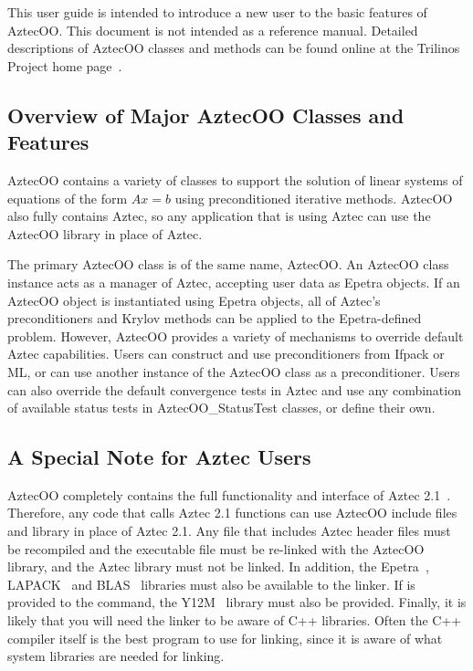 \documentclass[12pt,relax]{AztecOOUserGuide}
\newcommand{\statustest}{AztecOO\_StatusTest}
\begin{document}
This user guide is intended to introduce a new user to the basic features of AztecOO.
This document is not intended as a reference
manual.  Detailed descriptions of AztecOO classes and methods can be
found online at the Trilinos Project home page~\cite{Trilinos-home-page}.


\subsection{Overview of Major AztecOO Classes and Features}

AztecOO contains a variety of classes to support the solution of
linear systems of equations of the form $Ax=b$ using preconditioned
iterative methods.  AztecOO also fully contains Aztec, so any application
that is using Aztec can use the AztecOO library in place of Aztec.  

The primary AztecOO class is of the same name, AztecOO.  An AztecOO
class instance acts as a manager of Aztec, accepting user data as
Epetra objects.  If an AztecOO object is instantiated using Epetra
objects, all of Aztec's preconditioners and Krylov methods can be
applied to the Epetra-defined problem.  However, AztecOO provides a
variety of mechanisms to override default Aztec capabilities.  Users
can construct and use preconditioners from Ifpack or ML, or can use
another instance of the AztecOO class as a preconditioner.  Users can
also override the default convergence tests in Aztec and use any
combination of available status tests in \statustest{} classes,
or define their own.

\subsection{A Special Note for Aztec Users}

AztecOO completely contains the full functionality and interface of 
Aztec 2.1~\cite{Aztec2.1}.  Therefore, any code that calls Aztec 2.1 functions
can use AztecOO include files and library in place of Aztec 2.1.   Any file
that includes Aztec header files must be recompiled and the executable file must
be re-linked with the AztecOO library, and the Aztec library must not be linked.  
In addition, the Epetra~\cite{Epetra-home-page}, 
LAPACK~\cite{lapack} and BLAS~\cite{BLAS1, BLAS2, BLAS3}
libraries must also be available to the linker.  
If  is
provided to the  command, 
the Y12M~\cite{y12m} library must also be provided.
Finally, it is likely that you
will need the linker to be aware of C++ libraries.  Often the C++ compiler itself
is the best program to use for linking, since it is aware of what system libraries
are needed for linking.
\end{document}
